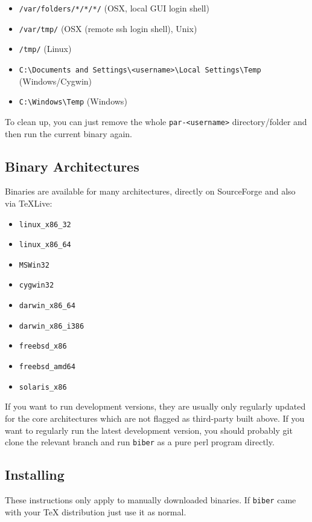 \documentclass{ltxdockit}
\begin{document}
\begin{itemize}
\item \verb+/var/folders/*/*/*/+ (OSX, local GUI login shell)
\item \verb+/var/tmp/+ (OSX (remote ssh login shell), Unix)
\item \verb+/tmp/+ (Linux)
\item \verb+C:\Documents and Settings\<username>\Local Settings\Temp+ (Windows/Cygwin)
\item \verb+C:\Windows\Temp+ (Windows)
\end{itemize}

\noindent To clean up, you can just remove the whole \verb+par-<username>+
directory/folder and then run the current binary again.

\subsection{Binary Architectures}

Binaries are available for many architectures, directly on SourceForge and
also via TeXLive:

\begin{itemize}
\item \verb+linux_x86_32+
\item \verb+linux_x86_64+
\item \verb+MSWin32+
\item \verb+cygwin32+
\item \verb+darwin_x86_64+
\item \verb+darwin_x86_i386+
\item \verb+freebsd_x86+\tpb
\item \verb+freebsd_amd64+\tpb
\item \verb+solaris_x86+\tpb
\end{itemize}

\noindent If you want to run development versions, they are usually only
regularly updated for the core architectures which are not flagged as
third-party built above. If you want to regularly run the latest
development version, you should probably git clone the relevant branch and
run \verb+biber+ as a pure perl program directly.

\subsection{Installing}

These instructions only apply to manually downloaded binaries. If
\verb+biber+ came with your TeX distribution just use it as normal.
\end{document}
